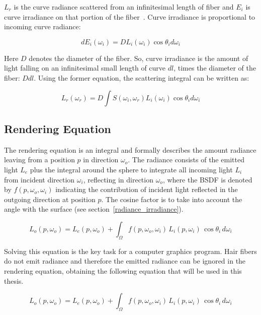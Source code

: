 \documentclass[11pt,a4paper]{report}
\begin{document}
$L_r$ is the curve radiance scattered from an infinitesimal length of fiber and $E_i$ is curve irradiance on that portion of the fiber~\cite{marschner}. Curve irradiance is proportional to incoming curve radiance:

\begin{equation}
dE_i(\omega_i) = D L_i(\omega_i) \cos \theta_i d \omega_i
\end{equation}

Here $D$ denotes the diameter of the fiber. So, curve irradiance is the amount of light falling on an infinitesimal small length of curve $dl$, times the diameter of the fiber: $D dl$. Using the former equation, the scattering integral can be written as:

\begin{equation}
L_r(\omega_r) = D \int S(\omega_i, \omega_r) L_i(\omega_i) \cos \theta_i d \omega_i
\end{equation}


\subsection{Rendering Equation}
The rendering equation is an integral and formally describes the amount radiance leaving from a position $p$ in direction $\omega_o$. The radiance consists of the emitted light $L_e$ plus the integral around the sphere to integrate all incoming light $L_i$ from incident direction $\omega_i$, reflecting in direction $\omega_o$, where the BSDF is denoted by $f(p, \omega_o, \omega_i)$ indicating the contribution of incident light reflected in the outgoing direction at position $p$. The cosine factor is to take into account the angle with the surface (see section~\ref{radiance_irradiance}).

\begin{equation}
L_o(p, \omega_o) = L_e(p, \omega_o) + \int_{\Omega} f(p, \omega_o, \omega_i)\, L_i(p, \omega_i)\, \cos \theta_i\, d\omega_i
\end{equation}

Solving this equation is the key task for a computer graphics program. Hair fibers do not emit radiance and therefore the emitted radiance can be ignored in the rendering equation, obtaining the following equation that will be used in this thesis.

\begin{equation}
L_o(p, \omega_o) = L_e(p, \omega_o) + \int_{\Omega} f(p, \omega_o, \omega_i)\, L_i(p, \omega_i)\, \cos \theta_i\, d\omega_i
\label{renderingEquation}
\end{equation}
\end{document}

